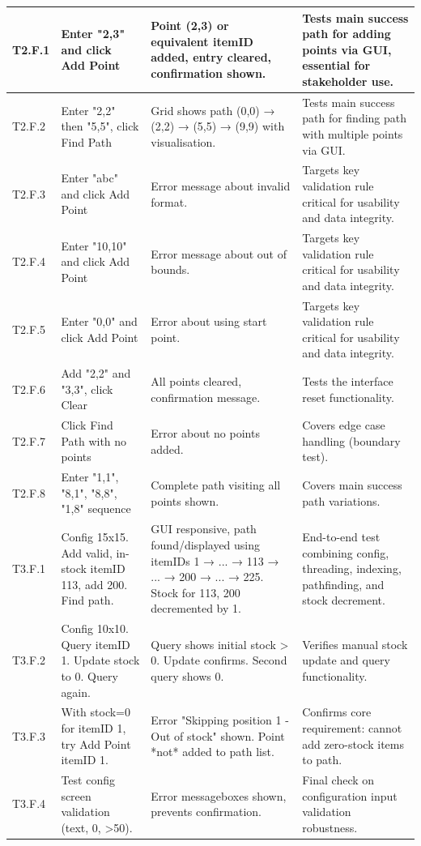 \begin{longtable}{|p{}|p{}|p{}|p{}|}
T2.F.1 & Enter "2,3" and click Add Point & Point (2,3) or equivalent itemID added, entry cleared, confirmation shown. & Tests main success path for adding points via GUI, essential for stakeholder use. \\
\hline
T2.F.2 & Enter "2,2" then "5,5", click Find Path & Grid shows path (0,0) → (2,2) → (5,5) → (9,9) with visualisation. & Tests main success path for finding path with multiple points via GUI. \\
\hline
T2.F.3 & Enter "abc" and click Add Point & Error message about invalid format. & Targets key validation rule critical for usability and data integrity. \\
\hline
T2.F.4 & Enter "10,10" and click Add Point & Error message about out of bounds. & Targets key validation rule critical for usability and data integrity. \\
\hline
T2.F.5 & Enter "0,0" and click Add Point & Error about using start point. & Targets key validation rule critical for usability and data integrity. \\
\hline
T2.F.6 & Add "2,2" and "3,3", click Clear & All points cleared, confirmation message. & Tests the interface reset functionality. \\
\hline
T2.F.7 & Click Find Path with no points & Error about no points added. & Covers edge case handling (boundary test). \\
\hline
T2.F.8 & Enter "1,1", "8,1", "8,8", "1,8" sequence & Complete path visiting all points shown. & Covers main success path variations. \\
\hline

T3.F.1 & Config 15x15. Add valid, in-stock itemID 113, add 200. Find path. & GUI responsive, path found/displayed using itemIDs 1 → ... → 113 → ... → 200 → ... → 225. Stock for 113, 200 decremented by 1. & End-to-end test combining config, threading, indexing, pathfinding, and stock decrement. \\
\hline
T3.F.2 & Config 10x10. Query itemID 1. Update stock to 0. Query again. & Query shows initial stock > 0. Update confirms. Second query shows 0. & Verifies manual stock update and query functionality. \\
\hline
T3.F.3 & With stock=0 for itemID 1, try Add Point itemID 1. & Error "Skipping position 1 - Out of stock" shown. Point *not* added to path list. & Confirms core requirement: cannot add zero-stock items to path. \\
\hline
T3.F.4 & Test config screen validation (text, 0, >50). & Error messageboxes shown, prevents confirmation. & Final check on configuration input validation robustness. \\
\hline


\end{longtable}
